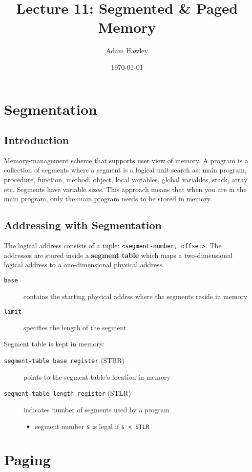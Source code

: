 \documentclass[11pt]{article}
\author{Adam Hawley}
\date{\today}
\title{Lecture 11: Segmented \& Paged Memory}
\begin{document}
\maketitle
\tableofcontents


\section{Segmentation}
\label{sec:org9dd22a9}
\subsection{Introduction}
\label{sec:org58c8edb}
Memory-management scheme that supports user view of memory.
A program is a collection of segments where a segment is a logical unit search as: main program, procedure, function, method, object, local variables, global variables, stack, array etc.
Segments have variable sizes.
This approach means that when you are in the main program, only the main program needs to be stored in memory.

\subsection{Addressing with Segmentation}
\label{sec:org93f22d3}
The logical address consists of a tuple: \texttt{<segment-number, offset>}.
The addresses are stored inside a \textbf{segment table} which maps a two-dimensional logical address to a one-dimensional physical address.
\begin{description}
\item[{\texttt{base}}] contains the starting physical addrss where the segments reside in memory
\item[{\texttt{limit}}] specifies the length of the segment
\end{description}
Segment table is kept in memory:
\begin{description}
\item[{\texttt{segment-table base register} (STBR)}] points to the segment table's location in memory
\item[{\texttt{segment-table length register} (STLR)}] indicates number of segments used by a program
\begin{itemize}
\item segment number \texttt{s} is legal if \texttt{s < STLR}
\end{itemize}
\end{description}

\section{Paging}
\label{sec:org213e9a5}
\end{document}
